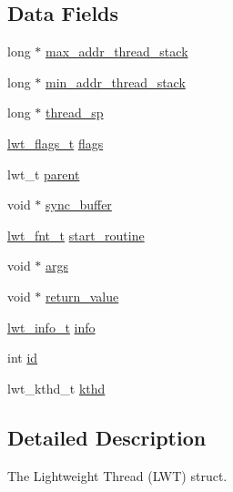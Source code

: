 \subsection*{Data Fields}
\begin{DoxyCompactItemize}
\item 
long $\ast$ \hyperlink{structlwt_ae97cdce617ee026378588f57a999f972}{max\+\_\+addr\+\_\+thread\+\_\+stack}
\item 
long $\ast$ \hyperlink{structlwt_a62ea9a882e0a197b9b076e1e018048d7}{min\+\_\+addr\+\_\+thread\+\_\+stack}
\item 
long $\ast$ \hyperlink{structlwt_aba48cdf2f962d7ededf74923ddd33ea1}{thread\+\_\+sp}
\item 
\hyperlink{enums_8h_a3e65a66932a8da34b1092c3a23d54c6f}{lwt\+\_\+flags\+\_\+t} \hyperlink{structlwt_a21694dc7499aff78ea8f90140b0ec60c}{flags}
\item 
lwt\+\_\+t \hyperlink{structlwt_a1849cde569fc8f254db05365de570b0e}{parent}
\item 
void $\ast$ \hyperlink{structlwt_ae78dc8102a1218ab1fcdd84815848716}{sync\+\_\+buffer}
\item 
\hyperlink{objects_8h_a58d5112b6c76cbcd033e124f6131a51a}{lwt\+\_\+fnt\+\_\+t} \hyperlink{structlwt_acdcfc344e943154b9d3d11e1a41cb9f1}{start\+\_\+routine}
\item 
void $\ast$ \hyperlink{structlwt_a6e870b21b996bc5c62b6cbd04328e784}{args}
\item 
void $\ast$ \hyperlink{structlwt_a22ac5beef8503481294035218e73c3ef}{return\+\_\+value}
\item 
\hyperlink{enums_8h_a1148b40d53237025b24f0b603b387e75}{lwt\+\_\+info\+\_\+t} \hyperlink{structlwt_a40641e751624b983f5e1ae5302210e5d}{info}
\item 
int \hyperlink{structlwt_aa3df3d76d606756e38bb9bd3d2c2d241}{id}
\item 
lwt\+\_\+kthd\+\_\+t \hyperlink{structlwt_acdbe9da0c85d9e466229304aa8d4474f}{kthd}
\end{DoxyCompactItemize}


\subsection{Detailed Description}
The Lightweight Thread (L\+W\+T) struct. 

